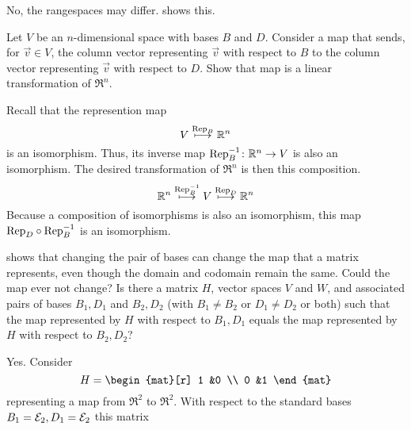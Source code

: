 \begin{exercises}
\begin{answer}
      No, the rangespaces may differ.
       shows this.
    \end{answer}
  \recommended \item 
    Let \( V \) be an \( n \)-dimensional space with bases \( B \) and
    \( D \).
    Consider a map that sends, for \( \vec{v}\in V\), 
    the column vector representing \( \vec{v} \) with
    respect to \( B \) to the column vector representing \( \vec{v} \) with
    respect to \( D \).
    Show that map is a linear transformation of \( \Re^n \).
    \begin{answer}
      Recall that the represention map
      \begin{equation*}
        V\stackrel{\text{Rep}_{B}}{\longmapsto}\mathbb{R}^n
      \end{equation*}
      is an isomorphism.
      Thus, its inverse map $\mbox{$\mbox{Rep}_B^{-1}\colon \mathbb{R}^n\to V$}$
      is also an isomorphism.
      The desired transformation of $\Re^n$ is then this composition.
      \begin{equation*}
        \mathbb{R}^n\stackrel{\text{Rep}_{B}^{-1}}{\longmapsto}
        V\stackrel{\text{Rep}_{D}}{\longmapsto}\mathbb{R}^n
      \end{equation*}
      Because a composition of isomorphisms is also an isomorphism, 
      this map $\mbox{Rep}_{D}\mathbin\circ \mbox{Rep}_{B}^{-1}$
      is an isomorphism.
    \end{answer}
  \item 
     shows that changing the pair of
    bases can change the map that a matrix
    represents, even though the domain and codomain remain the same.
    Could the map ever not change?
    Is there a matrix \( H \), vector spaces \( V \) and \( W \), and
    associated pairs of bases \( B_1,D_1 \) and \( B_2,D_2 \) (with
    \( B_1\neq B_2 \) or \( D_1\neq D_2 \) or both) 
    such that the map represented
    by \( H \) with respect to \( B_1,D_1 \) equals the map represented
    by \( H \) with respect to \( B_2,D_2 \)?
    \begin{answer}
      Yes.
      Consider
      \begin{equation*}
        H=\begin{mat}[r]
            1  &0  \\
            0  &1
          \end{mat}
      \end{equation*}
      representing a map from \( \Re^2 \) to \( \Re^2 \).
      With respect to the standard bases 
      \( B_1={\cal E}_2, D_1={\cal E}_2 \) this matrix

\end{answer}
\end{exercises}
